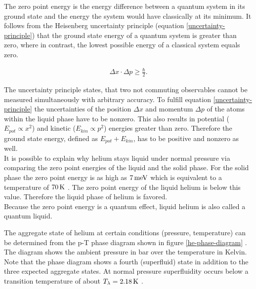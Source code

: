 \documentclass[parskip,12pt,headsepline,a4paper] {scrbook}
\begin{document}
The zero point energy is the energy difference between a quantum system in its ground state and the energy the system would have classically at its minimum. It follows from the Heisenberg uncertainty principle (equation \ref{uncertainty-principle}) that the ground state energy of a quantum system is greater than zero, where in contrast, the lowest possible energy of a classical system equals zero.

\begin{align}  \label{uncertainty-principle}
\Delta x \cdot \Delta p \ge \frac{\hbar}{2} .
\end{align}

The uncertainty principle states, that two not commuting observables cannot be measured simultaneously with arbitrary accuracy. To fulfill equation \ref{uncertainty-principle} the uncertainties of the position $\Delta x$ and momentum $\Delta p$ of the atoms within the liquid phase have to be nonzero. This also results in potential ($E_{pot} \propto x^2$) and kinetic ($E_{kin} \propto p^2$) energies greater than zero. Therefore the ground state energy, defined as $E_{pot} + E_{kin}$, has to be positive and nonzero as well. \\
It is possible to explain why helium stays liquid under normal pressure via comparing the zero point energies of the liquid and the solid phase. For the solid phase the zero point energy is as high as $\unit[7]{meV}$ which is equivalent to a temperature of $\unit[70]{K}$ \cite{lackner}. The zero point energy of the liquid helium is below this value. Therefore the liquid phase of helium is favored. \\
Because the zero point energy is a quantum effect, liquid helium is also called a quantum liquid.


The aggregate state of helium at certain conditions (pressure, temperature) can be determined from the p-T phase diagram shown in figure \ref{he-phase-diagram} \cite{fliessbach}. The diagram shows the ambient pressure in bar over the temperature in Kelvin. Note that the phase diagram shows a fourth (superfluid) state in addition to the three expected aggregate states. At normal pressure superfluidity occurs below a transition temperature of about $T_\lambda = \unit[2.18]{K}$ \cite{toennis}. \\
\end{document}
